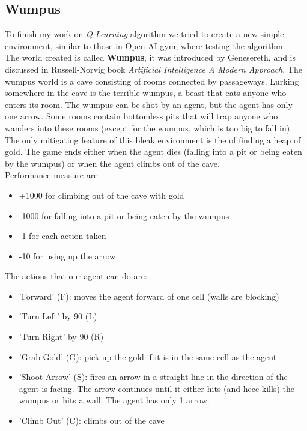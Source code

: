 \documentclass[]{report}
\begin{document}
\subsection{Wumpus}
To finish my work on \emph{Q-Learning} algorithm we tried to create a new simple environment, similar to those in Open AI gym, where testing the algorithm.\\
The world created is called \textbf{Wumpus}, it was introduced by Genesereth, and is discussed in Russell-Norvig book \emph{Artificial Intelligence A Modern Approach}.
The wumpus world is a cave consisting of rooms connected by passageways. Lurking somewhere in the cave is the terrible wumpus, a beast that eats anyone who enters its room. The wumpus can be shot by an agent, but the agent has only one arrow. Some rooms contain bottomless pits that will trap anyone who wanders into these rooms (except for the wumpus, which is too big to fall in). The only mitigating feature of this bleak environment is the of finding a heap of gold. The game ends either when the agent dies (falling into a pit or being eaten by the wumpus) or when the agent climbs out of the cave.\\
Performance measure are:
\begin{itemize}
	\item +1000 for climbing out of the cave with gold
	\item -1000 for falling into a pit or being eaten by the wumpus
	\item -1 for each action taken
	\item -10 for using up the arrow
\end{itemize}

\vspace{7 mm}
The actions that our agent can do are:
\vspace{5 mm}
\begin{itemize}
	\item 'Forward' (F): moves the agent forward of one cell (walls are blocking)
	\item 'Turn Left' by 90 (L)
	\item 'Turn Right' by 90 (R)
	\item 'Grab Gold' (G): pick up the gold if it is in the same cell as the agent
	\item 'Shoot Arrow' (S): fires an arrow in a straight line in the direction of the agent is facing. The arrow continues until it either hits (and hece kills) the wumpus or hits a wall. The agent has only 1 arrow.
	\item 'Climb Out' (C): climbs out of the cave	   
\end{itemize}
\end{document}

